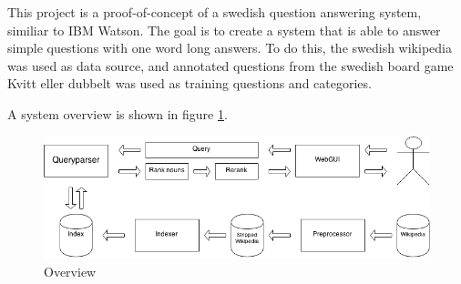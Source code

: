 This project is a proof-of-concept of a swedish question answering system, similiar to IBM Watson.
The goal is to create a system that is able to answer simple questions with one word long answers.
To do this, the swedish wikipedia was used as data source, and annotated questions from the swedish 
board game Kvitt eller dubbelt was used as training questions and categories.

A system overview is shown in figure \ref{fig:overview}. 

\begin{figure}
\centering
\includegraphics[width=1\textwidth]{figures/Question-answering-system.png}
\caption{Overview}
\label{fig:overview}
\end{figure}
